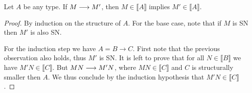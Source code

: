 \documentclass[]{StandardTemplate}
\begin{document}
\begin{lem}
  \label{pres}
 Let $ A $ be any type. If $ M \longrightarrow M' $, then $ M \in \llbracket A \rrbracket $ implies $ M' \in \llbracket A \rrbracket $.
\end{lem}
\begin{proof}
  By induction on the structure of $ A $.  For the base case, note that if $ M $ is SN then $ M' $  is also SN.

  For the induction step we have $ A = B \to C $. First note that the previous observation also holds, thus $ M' $ is SN. It is left to prove that for all $ N \in \llbracket B \rrbracket $ we have $ M' N \in \llbracket C \rrbracket $. But $ M N \longrightarrow M' N $, where $ M N \in \llbracket C \rrbracket $ and $ C $ is structurally smaller then $ A $. We thus conclude by the induction hypothesis that $ M' N \in \llbracket C \rrbracket$.
\end{proof}
\end{document}
